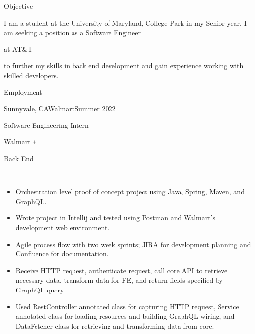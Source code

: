 \documentclass[]{mcdowellcv}
\begin{document}
	\makeheader
	
  \begin{cvsection}{Objective}
    
    \begin{cvsubsection}{}{}{}
      \iftrue
      I am a student at the University of Maryland, College Park in my Senior year. I am seeking a position as a Software Engineer %
      \fi
      \iftrue
      at AT\&T %
      \fi
      \iftrue
      to further my skills in back end development and gain experience working with skilled developers.
      \fi
    \end{cvsubsection}
    
  \end{cvsection}

  \begin{cvsection}{Employment}
    \begin{cvsubsection}{Sunnyvale, CA}{Walmart}{Summer 2022}
      \begin{center}
        \begin{itemize*}
          \item Software Engineering Intern
          \item Walmart \texttt{+}
          \item Back End
          \item ~
        \end{itemize*}
      \end{center}
      \begin{itemize}
        \item Orchestration level proof of concept project using Java, Spring, Maven, and GraphQL.
        \item Wrote project in Intellij and tested using Postman and Walmart's development web environment.
        \item Agile process flow with two week sprints; JIRA for development planning and Confluence for documentation.
        \item Receive HTTP request, authenticate request, call core API to retrieve necessary data, transform data for FE, %
        and return fields specified by GraphQL query.
        \item Used RestController annotated class for capturing HTTP request, Service annotated class for loading resources %
        and building GraphQL wiring, and DataFetcher class for retrieving and transforming data from core.
      \end{itemize}
    \end{cvsubsection} 
  \end{cvsection}
\end{document}
